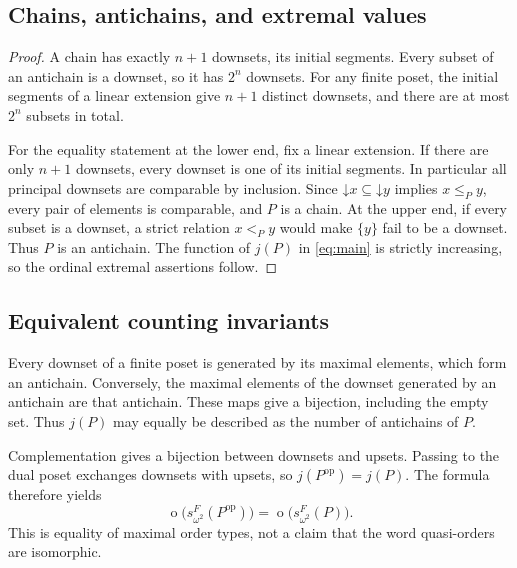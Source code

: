 \documentclass[11pt,a4paper]{article}
\numberwithin{equation}{section}
\newtheorem{corollary}[theorem]{Corollary}
\theoremstyle{definition}
\theoremstyle{remark}
\newcommand{\mot}{\mathop{o}}
\newcommand{\down}{\mathord{\downarrow}}
\newcommand{\Wordspace}[1]{s_{\omega^2}^{F}(#1)}
\begin{document}
\subsection{Chains, antichains, and extremal values}

\begin{proof}
A chain has exactly $n+1$ downsets, its initial segments. Every subset of
an antichain is a downset, so it has $2^n$ downsets. For any finite poset,
the initial segments of a linear extension give $n+1$ distinct downsets,
and there are at most $2^n$ subsets in total.

For the equality statement at the lower end, fix a linear extension. If
there are only $n+1$ downsets, every downset is one of its initial segments.
In particular all principal downsets are comparable by inclusion. Since
$\down x\subseteq\down y$ implies $x\le_P y$, every pair of elements is
comparable, and $P$ is a chain. At the upper end, if every subset is a
downset, a strict relation $x<_P y$ would make $\{y\}$ fail to be a downset.
Thus $P$ is an antichain. The function of $j(P)$ in \eqref{eq:main} is
strictly increasing, so the ordinal extremal assertions follow.
\end{proof}

\subsection{Equivalent counting invariants}
Every downset of a finite poset is generated by its maximal elements,
which form an antichain. Conversely, the maximal elements of the downset
generated by an antichain are that antichain. These maps give a bijection,
including the empty set. Thus $j(P)$ may equally be described as the number
of antichains of $P$.

Complementation gives a bijection between downsets and upsets. Passing to
the dual poset exchanges downsets with upsets, so $j(P^{\mathrm{op}})=j(P)$.
The formula therefore yields
\[
 \mot\bigl(\Wordspace {P^{\mathrm{op}}}\bigr)
 =\mot\bigl(\Wordspace P\bigr).
\]
This is equality of maximal order types, not a claim that the word
quasi-orders are isomorphic.
\end{document}
